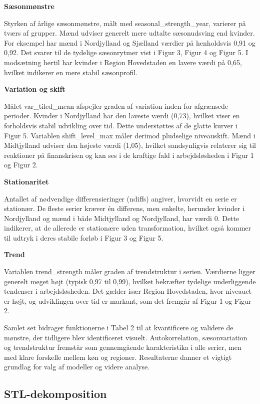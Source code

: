 \documentclass[
]{article}
\begin{document}
\textbf{Sæsonmønstre}

Styrken af årlige sæsonmønstre, målt med seasonal\_strength\_year,
varierer på tværs af grupper. Mænd udviser generelt mere udtalte
sæsonudsving end kvinder. For eksempel har mænd i Nordjylland og
Sjælland værdier på henholdsvis 0,91 og 0,92. Det svarer til de tydelige
sæsonrytmer vist i Figur 3, Figur 4 og Figur 5. I modsætning hertil har
kvinder i Region Hovedstaden en lavere værdi på 0,65, hvilket indikerer
en mere stabil sæsonprofil.

\textbf{Variation og skift}

Målet var\_tiled\_mean afspejler graden af variation inden for
afgrænsede perioder. Kvinder i Nordjylland har den laveste værdi (0,73),
hvilket viser en forholdsvis stabil udvikling over tid. Dette
understøttes af de glatte kurver i Figur 5. Variablen shift\_level\_max
måler derimod pludselige niveauskift. Mænd i Midtjylland udviser den
højeste værdi (1,05), hvilket sandsynligvis relaterer sig til reaktioner
på finanskrisen og kan ses i de kraftige fald i arbejdsløsheden i Figur
1 og Figur 2.

\textbf{Stationaritet}

Antallet af nødvendige differensieringer (ndiffs) angiver, hvorvidt en
serie er stationær. De fleste serier kræver én differens, men enkelte,
herunder kvinder i Nordjylland og mænd i både Midtjylland og
Nordjylland, har værdi 0. Dette indikerer, at de allerede er stationære
uden transformation, hvilket også kommer til udtryk i deres stabile
forløb i Figur 3 og Figur 5.

\textbf{Trend}

Variablen trend\_strength måler graden af trendstruktur i serien.
Værdierne ligger generelt meget højt (typisk 0,97 til 0,99), hvilket
bekræfter tydelige underliggende tendenser i arbejdsløsheden. Det gælder
især Region Hovedstaden, hvor niveauet er højt, og udviklingen over tid
er markant, som det fremgår af Figur 1 og Figur 2.

Samlet set bidrager funktionerne i Tabel 2 til at kvantificere og
validere de mønstre, der tidligere blev identificeret visuelt.
Autokorrelation, sæsonvariation og trendstruktur fremstår som
gennemgående karakteristika i alle serier, men med klare forskelle
mellem køn og regioner. Resultaterne danner et vigtigt grundlag for valg
af modeller og videre analyse.

\subsection{STL-dekomposition}\label{stl-dekomposition}
\end{document}
